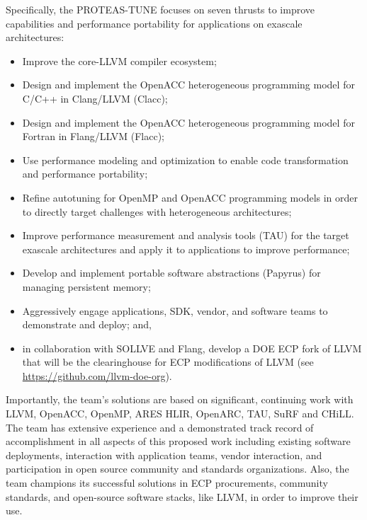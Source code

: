 Specifically, the PROTEAS-TUNE focuses on seven thrusts to improve capabilities and performance portability for applications on exascale architectures: 

\begin{itemize}
\item 
    Improve the core-LLVM compiler ecosystem; 
\item 
	Design and implement the OpenACC heterogeneous programming model for C/C++ in Clang/LLVM (Clacc);
\item 
    Design and implement the OpenACC heterogeneous programming model for Fortran in Flang/LLVM (Flacc);  
    
\item 
	Use performance modeling and optimization to enable code transformation and performance portability;
\item 
	Refine autotuning for OpenMP and OpenACC programming models in order to directly target challenges with heterogeneous architectures;
\item 
    Improve performance measurement and analysis tools (TAU) for the target exascale architectures and apply it to applications to improve performance;
\item 
    Develop and implement portable software abstractions (Papyrus) for managing persistent memory;
\item 
    Aggressively engage applications, SDK, vendor, and software teams to demonstrate and deploy; and,
\item
    in collaboration with SOLLVE and Flang, develop a DOE ECP fork of LLVM that will be the clearinghouse for ECP modifications of LLVM  (see \url{https://github.com/llvm-doe-org}).
    
\end{itemize}

Importantly, the team’s solutions are based on significant, continuing work with LLVM, OpenACC, OpenMP, ARES HLIR, OpenARC, TAU, SuRF and CHiLL. The team has extensive experience and a demonstrated track record of accomplishment in all aspects of this proposed work including existing software deployments, interaction with application teams, vendor interaction, and participation in open source community and standards organizations. Also, the team champions its successful solutions in ECP procurements, community standards, and open-source software stacks, like LLVM, in order to improve their use.

